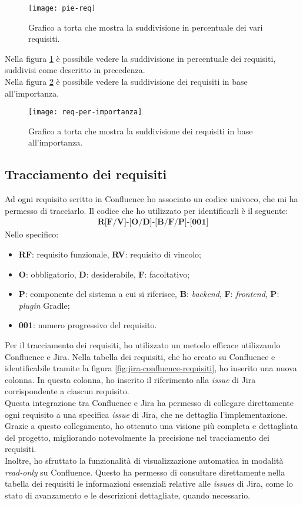 \begin{figure}[!h] 
  \centering 
  \texttt{[image: pie-req]} 
  \caption{Grafico a torta che mostra la suddivisione in percentuale dei vari requisiti.}
  \label{fig:pie-req}
\end{figure}
\noindent Nella figura \ref*{fig:pie-req} è possibile vedere la suddivisione in percentuale dei requisiti, 
suddivisi come descritto in precedenza.\\
Nella figura \ref*{fig:req-per-importanza} è possibile vedere la suddivisione dei requisiti in base all'importanza.
\begin{figure}[!h] 
  \centering 
  \texttt{[image: req-per-importanza]} 
  \caption{Grafico a torta che mostra la suddivisione dei requisiti in base all'importanza.}
  \label{fig:req-per-importanza}
\end{figure}

\subsection{Tracciamento dei requisiti}
Ad ogni requisito scritto in Confluence ho associato un codice univoco, che mi ha permesso di tracciarlo.
Il codice che ho utilizzato per identificarli è il seguente:
\begin{align*}
  \textbf{R[F/V]-[O/D]-[B/F/P]-[001]}
\end{align*}
Nello specifico:
\begin{itemize}
    \item \textbf{RF}: requisito funzionale, \textbf{RV}: requisito di vincolo;
    \item \textbf{O}: obbligatorio, \textbf{D}: desiderabile, \textbf{F}: facoltativo;
    \item \textbf{P}: componente del sistema a cui si riferisce, \textbf{B}: \textit{backend}, \textbf{F}: \textit{frontend}, \textbf{P}: \textit{plugin} Gradle;
    \item \textbf{001}: numero progressivo del requisito.
\end{itemize}

\noindent Per il tracciamento dei requisiti, ho utilizzato un metodo efficace utilizzando Confluence e Jira. 
Nella tabella dei requisiti, che ho creato su Confluence e identificabile tramite la figura \ref*{fig:jira-confluence-requisiti}, 
ho inserito una nuova colonna. In questa colonna, ho inserito il riferimento alla \textit{issue} di 
Jira corrispondente a ciascun requisito.\\
Questa integrazione tra Confluence e Jira ha permesso di collegare direttamente ogni requisito a una specifica 
\textit{issue} di Jira, che ne dettaglia l'implementazione. Grazie a questo collegamento, ho ottenuto una visione più 
completa e dettagliata del progetto, migliorando notevolmente la precisione nel tracciamento dei requisiti.\\
Inoltre, ho sfruttato la funzionalità di visualizzazione automatica in modalità \textit{read-only} su Confluence. 
Questo ha permesso di consultare direttamente nella tabella dei requisiti le informazioni essenziali relative alle \textit{issues} 
di Jira, come lo stato di avanzamento e le descrizioni dettagliate, quando necessario.

